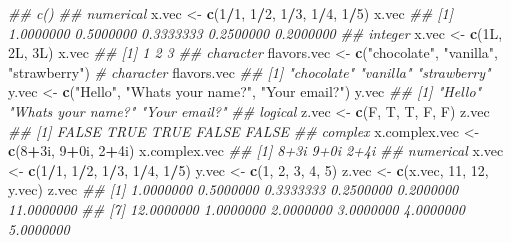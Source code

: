 \documentclass[
]{book}
\newenvironment{Shaded}{\begin{snugshade}}{\end{snugshade}}
\newcommand{\CommentTok}[1]{\textcolor[rgb]{0.56,0.35,0.01}{\textit{#1}}}
\newcommand{\DecValTok}[1]{\textcolor[rgb]{0.00,0.00,0.81}{#1}}
\newcommand{\KeywordTok}[1]{\textcolor[rgb]{0.13,0.29,0.53}{\textbf{#1}}}
\newcommand{\NormalTok}[1]{#1}
\newcommand{\OperatorTok}[1]{\textcolor[rgb]{0.81,0.36,0.00}{\textbf{#1}}}
\newcommand{\StringTok}[1]{\textcolor[rgb]{0.31,0.60,0.02}{#1}}
\begin{document}
\begin{Shaded}
\begin{Highlighting}[]
\CommentTok{\#\# c()}
\CommentTok{\#\# numerical}
\NormalTok{x.vec \textless{}{-}}\StringTok{ }\KeywordTok{c}\NormalTok{(}\DecValTok{1}\OperatorTok{/}\DecValTok{1}\NormalTok{, }\DecValTok{1}\OperatorTok{/}\DecValTok{2}\NormalTok{, }\DecValTok{1}\OperatorTok{/}\DecValTok{3}\NormalTok{, }\DecValTok{1}\OperatorTok{/}\DecValTok{4}\NormalTok{, }\DecValTok{1}\OperatorTok{/}\DecValTok{5}\NormalTok{)}
\NormalTok{x.vec}
\CommentTok{\#\# [1] 1.0000000 0.5000000 0.3333333 0.2500000 0.2000000}
\CommentTok{\#\# integer}
\NormalTok{x.vec \textless{}{-}}\StringTok{ }\KeywordTok{c}\NormalTok{(1L, 2L, 3L)}
\NormalTok{x.vec}
\CommentTok{\#\# [1] 1 2 3}
\CommentTok{\#\# character}
\NormalTok{flavors.vec \textless{}{-}}\StringTok{ }\KeywordTok{c}\NormalTok{(}\StringTok{"chocolate"}\NormalTok{, }\StringTok{"vanilla"}\NormalTok{, }\StringTok{"strawberry"}\NormalTok{) }\CommentTok{\# character}
\NormalTok{flavors.vec}
\CommentTok{\#\# [1] "chocolate"  "vanilla"    "strawberry"}
\NormalTok{y.vec \textless{}{-}}\StringTok{ }\KeywordTok{c}\NormalTok{(}\StringTok{"Hello"}\NormalTok{, }\StringTok{"What\textquotesingle{}s your name?"}\NormalTok{, }\StringTok{"Your email?"}\NormalTok{)}
\NormalTok{y.vec}
\CommentTok{\#\# [1] "Hello"             "What\textquotesingle{}s your name?" "Your email?"}
\CommentTok{\#\# logical}
\NormalTok{z.vec \textless{}{-}}\StringTok{ }\KeywordTok{c}\NormalTok{(F, T, T, F, F)}
\NormalTok{z.vec}
\CommentTok{\#\# [1] FALSE  TRUE  TRUE FALSE FALSE}
\CommentTok{\#\# complex}
\NormalTok{x.complex.vec \textless{}{-}}\StringTok{ }\KeywordTok{c}\NormalTok{(}\DecValTok{8}\OperatorTok{+}\NormalTok{3i, }\DecValTok{9}\OperatorTok{+}\NormalTok{0i, }\DecValTok{2}\OperatorTok{+}\NormalTok{4i)}
\NormalTok{x.complex.vec}
\CommentTok{\#\# [1] 8+3i 9+0i 2+4i}
\CommentTok{\#\# numerical}
\NormalTok{x.vec \textless{}{-}}\StringTok{ }\KeywordTok{c}\NormalTok{(}\DecValTok{1}\OperatorTok{/}\DecValTok{1}\NormalTok{, }\DecValTok{1}\OperatorTok{/}\DecValTok{2}\NormalTok{, }\DecValTok{1}\OperatorTok{/}\DecValTok{3}\NormalTok{, }\DecValTok{1}\OperatorTok{/}\DecValTok{4}\NormalTok{, }\DecValTok{1}\OperatorTok{/}\DecValTok{5}\NormalTok{)}
\NormalTok{y.vec \textless{}{-}}\StringTok{ }\KeywordTok{c}\NormalTok{(}\DecValTok{1}\NormalTok{, }\DecValTok{2}\NormalTok{, }\DecValTok{3}\NormalTok{, }\DecValTok{4}\NormalTok{, }\DecValTok{5}\NormalTok{)}
\NormalTok{z.vec \textless{}{-}}\StringTok{ }\KeywordTok{c}\NormalTok{(x.vec, }\DecValTok{11}\NormalTok{, }\DecValTok{12}\NormalTok{, y.vec)}
\NormalTok{z.vec}
\CommentTok{\#\#  [1]  1.0000000  0.5000000  0.3333333  0.2500000  0.2000000 11.0000000}
\CommentTok{\#\#  [7] 12.0000000  1.0000000  2.0000000  3.0000000  4.0000000  5.0000000}
\end{Highlighting}
\end{Shaded}
\end{document}
